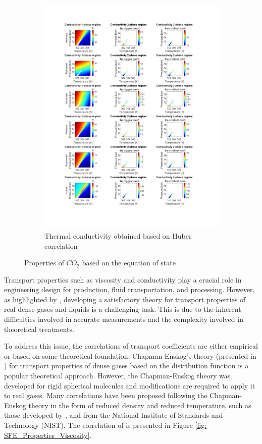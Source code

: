 \documentclass[../Article_Model_Parameters.tex]{subfiles}
\begin{document}
\begin{figure}[H]
\begin{subfigure}[b]{0.31\textwidth}
			\includegraphics[trim = 2.5cm 2.8cm 14.3cm 21.4cm,clip,width=\textwidth]{Figures/KT.pdf}	
			\caption{Thermal conductivity obtained based on Huber correlation}
			\label{fig: SFE_Properties_Thermal}
		\end{subfigure}
		\caption{Properties of $CO_2$ based on the equation of state}
		\label{fig: SFE_Properties}
	\end{figure}    
	
	Transport properties such as viscosity and conductivity play a crucial role in engineering design for production, fluid transportation, and processing. However, as highlighted by \citet{Sheng1989}, developing a satisfactory theory for transport properties of real dense gases and liquids is a challenging task. This is due to the inherent difficulties involved in accurate measurements and the complexity involved in theoretical treatments.
	
	To address this issue, the correlations of transport coefficients are either empirical or based on some theoretical foundation. Chapman-Enskog's theory (presented in \citet{Chapman1991}) for transport properties of dense gases based on the distribution function is a popular theoretical approach. However, the Chapman-Enskog theory was developed for rigid spherical molecules and modifications are required to apply it to real gases. Many correlations have been proposed following the Chapman-Enskog theory in the form of reduced density and reduced temperature, such as those developed by \citet{Fenghour1998}, and \citet{Laesecke2017} from the National Institute of Standards and Technology (NIST). The correlation of \citet{Laesecke2017} is presented in Figure \ref{fig: SFE_Properties_Viscosity}.
	
\end{document}
